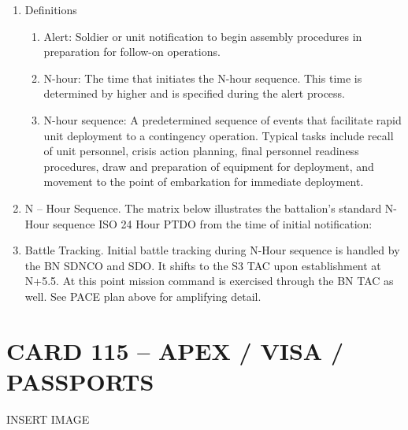 \documentclass{article}
\begin{document}
\begin{enumerate}
\begin{enumerate}
\end{enumerate}
\item	Definitions
\begin{enumerate}
    \item Alert: Soldier or unit notification to begin assembly procedures in preparation for follow-on operations.
\item	N-hour: The time that initiates the N-hour sequence. This time is determined by higher and is specified during the alert process.
\item	N-hour sequence: A predetermined sequence of events that facilitate rapid unit deployment to a contingency operation. Typical tasks include recall of unit personnel, crisis action planning, final personnel readiness procedures, draw and preparation of equipment for deployment, and movement to the point of embarkation for immediate deployment.
\end{enumerate}
\item	N – Hour Sequence. 
The matrix below illustrates the battalion’s standard N-Hour sequence ISO 24 Hour PTDO from the time of initial notification: 
\item	Battle Tracking. 
Initial battle tracking during N-Hour sequence is handled by the BN SDNCO and SDO. It shifts to the S3 TAC upon establishment at N+5.5. At this point mission command is exercised through the BN TAC as well. See PACE plan above for amplifying detail.
\end{enumerate}

\newpage
\section*{CARD 115 – APEX / VISA / PASSPORTS}
INSERT IMAGE

\newpage
\end{document}

